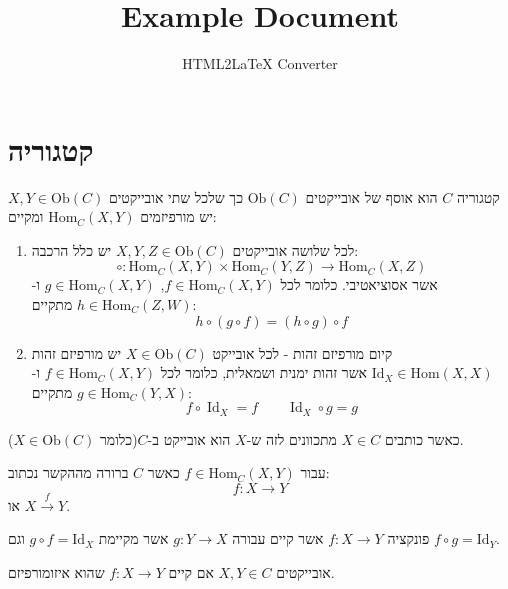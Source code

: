 \documentclass{tstextbook}
\begin{document}
\title{Example Document}
\author{HTML2LaTeX Converter}
\maketitle


\section{קטגוריה}

\begin{definition}[קטגוריה]
קטגוריה \(C\) הוא אוסף של אובייקטים \(\mathrm{Ob}(C)\) כך שלכל שתי אובייקטים \(X,Y\in \mathrm{Ob}(C)\) יש מורפיזמים \(\mathrm{Hom}_{C}(X,Y)\) ומקיים:

  \begin{enumerate}
    \item לכל שלושה אובייקטים \(X,Y,Z\in \mathrm{Ob}(C)\) יש כלל הרכבה: 
$$\circ:{\mathrm{Hom}}_{C}(X,Y)\times{\mathrm{Hom}}_{C}(Y,Z)\to{\mathrm{Hom}}_{C}(X,Z)$$
אשר אסוציאטיבי. כלומר לכל \(f\in \mathrm{Hom}_{C}(X,Y)\), \(g \in \mathrm{Hom}_{C}(X,Y)\) ו-\(h \in \mathrm{Hom}_{C}(Z,W)\) מתקיים:
$$h\circ(g\circ f)=(h\circ g)\circ f$$


    \item קיום מורפיזם זהות - לכל אובייקט \(X \in \mathrm{Ob}(C)\) יש מורפיזם זהות \(\mathrm{Id}_{X}\in \mathrm{Hom}(X,X)\) אשר זהות ימנית ושמאלית, כלומר לכל \(f \in \mathrm{Hom}_{C}(X,Y)\) ו-\(g \in \mathrm{Hom}_{C}(Y,X)\) מתקיים: 
$$f\circ\operatorname{Id}_{X}=f\qquad \operatorname{Id}_{X}\circ g=g$$


  \end{enumerate}
\end{definition}
\begin{symbolize}
כאשר כותבים \(X \in C\) מתכוונים לזה ש-\(X\) הוא אובייקט ב-\(C\)(כלומר \(X \in \mathrm{Ob}(C)\)).

\end{symbolize}
\begin{symbolize}
עבור \(f \in \mathrm{Hom}_{C}(X,Y)\) כאשר \(C\) ברורה מההקשר נכתוב:
$$f:X\to Y$$
או \(X\xrightarrow{f}Y\).

\end{symbolize}
\begin{definition}[איזומורפיזם]
פונקציה \(f:X\to Y\) אשר קיים עבורה \(g:Y\to X\) אשר מקיימת \(g\circ f = \mathrm{Id}_{X}\) וגם \(f\circ g = \mathrm{Id}_{Y}\).

\end{definition}
\begin{definition}[איזומורפיים]
אובייקטים \(X,Y \in C\) אם קיים \(f:X\to Y\) שהוא איזומורפיזם.

\end{definition}
\end{document}
